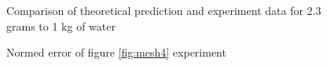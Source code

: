 \documentclass{article}
\begin{document}
\begin{figure}
\begin{center}
\begin{minipage}[h]{0.47\linewidth}
\end{minipage}
\caption{Comparison of theoretical prediction and experiment data for 2.3 grams to 1 kg of water}
\label{fig:mesh5}

\end{center}
\end{figure}
\begin{figure}
\begin{center}

\begin{minipage}[h]{0.47\linewidth}
\caption{Normed error of figure \ref{fig:mesh4} experiment}
\label{fig:dif6}
\end{minipage}
\hfill
\begin{minipage}[h]{0.47\linewidth}

\end{minipage}
\end{center}
\end{figure}
\end{document}
